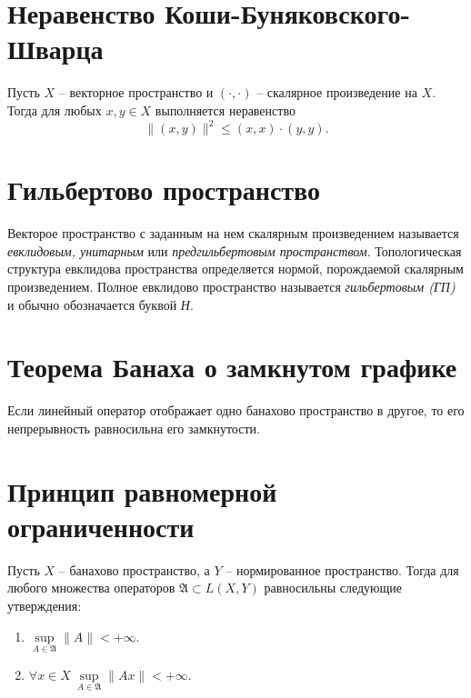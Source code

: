 \section{Неравенство Коши-Буняковского-Шварца}

\begin{theorem}
	Пусть $X$ -- векторное пространство и $(\cdot,\cdot)$ -- скалярное произведение на $X$. Тогда для любых $x,y \in X$ выполняется неравенство
	\[
		\big\|(x,y)\big\|^2 \leqslant (x,x)\cdot(y,y).
	\]
\end{theorem}

\section{Гильбертово пространство}

\begin{definition}
	Векторое пространство с заданным на нем скалярным произведением называется \emph{евклидовым, унитарным} или \emph{предгильбертовым пространством}. Топологическая структура евклидова пространства определяется нормой, порождаемой скалярным произведением. Полное евклидово пространство называется \emph{гильбертовым (ГП)} и обычно обозначается буквой \emph{Н}.
\end{definition}

\section{Теорема Банаха о замкнутом графике}

\begin{theorem}
	Если линейный оператор отображает одно банахово пространство в другое, то его непрерывность равносильна его замкнутости.
\end{theorem}

\section{Принцип равномерной ограниченности}

\begin{theorem}
	Пусть $X$ -- банахово пространство, а $Y$ -- нормированное пространство. Тогда для любого множества операторов $\mathfrak{A}\subset L(X,Y)$ равносильны следующие утверждения:
	\begin{enumerate}
		\item $\underset{A \in \mathfrak{A}}{\sup} \|A\| < +\infty $.
		\item $\forall x \in X \ \underset{A \in \mathfrak{A}}{\sup} \|Ax\| < +\infty $.
	\end{enumerate}
\end{theorem}

